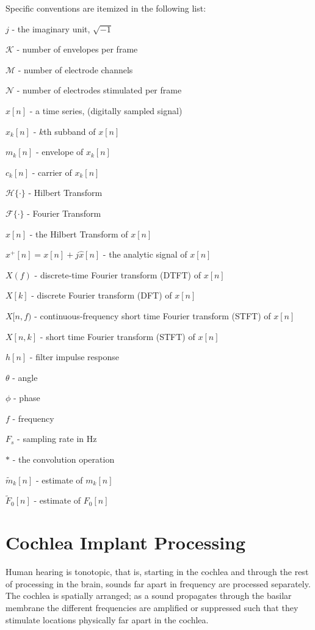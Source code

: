 \documentclass [11pt, proquest,oneside] {ganter_thesis}[2015/03/03]
\begin{document}
Specific conventions are itemized in the following list:

$j$ - the imaginary unit, $\sqrt{-1}$

$\mathcal{K}$ - number of envelopes per frame

$\mathcal{M}$ - number of electrode channels

$\mathcal{N}$ - number of electrodes stimulated per frame

$x[n]$ - a time series, (digitally sampled signal)

$x_k[n]$ - $k$th subband of $x[n]$

$m_k[n]$ - envelope of $x_k[n]$

$c_k[n]$ - carrier of $x_k[n]$

$\mathcal{H}\{\cdot\}$ - Hilbert Transform

$\mathcal{F}\{\cdot\}$ - Fourier Transform

$\widehat{x}[n]$ - the Hilbert Transform of $x[n]$

$x^+[n] = x[n] + j\widehat{x}[n]$ - the analytic signal of $x[n]$

$X(f)$ - discrete-time Fourier transform (DTFT) of $x[n]$

$X[k]$ - discrete Fourier transform (DFT) of $x[n]$

$X[n,f)$ - continuous-frequency short time Fourier transform (STFT) of $x[n]$

$X[n,k]$ - short time Fourier transform (STFT) of $x[n]$

$h[n]$ - filter impulse response

$\theta$ - angle

$\phi$ - phase

$f$ - frequency

$F_s$ - sampling rate in Hz

$*$ - the convolution operation

$\tilde{m}_k[n]$ - estimate of $m_k[n]$

$\tilde{F}_0[n]$ - estimate of $F_0[n]$



\chapter{Cochlea Implant Processing}\label{ch:ci_processing}

Human hearing is tonotopic, that is, starting in the cochlea and through the rest of processing in the brain, sounds far apart in frequency are processed separately.  The cochlea is spatially arranged; as a sound propagates through the basilar membrane the different frequencies are amplified or suppressed such that they stimulate locations physically far apart in the cochlea.
\end{document}
